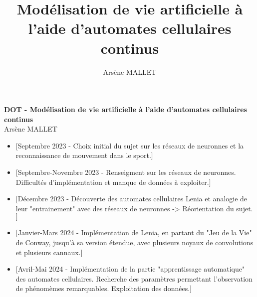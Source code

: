 \documentclass[a4paper, 11pt]{article}
\author{Arsène MALLET}
\title{Mod\'elisation de vie artificielle à l'aide d'automates cellulaires continus}
\begin{document}
    
\begin{center}
    {\textbf {\LARGE DOT - Mod\'elisation de vie artificielle à l'aide d'automates cellulaires continus}} \\
    \vspace{3mm}
    {\small Arsène MALLET}
\end{center}

\vspace{5mm}

\begin{itemize}
    \item $\bigl[$Septembre 2023 - Choix initial du sujet sur les r\'eseaux de neuronnes et la reconnaissance de mouvement dans le sport.$\bigr]$
    \item $\bigl[$Septembre-Novembre 2023 - Renseigment sur les r\'eseaux de neuronnes. Difficult\'es d'impl\'ementation et manque de donn\'ees \`a exploiter.$\bigr]$
    \item $\bigl[$D\'ecembre 2023 - D\'ecouverte des automates cellulaires Lenia et analogie de leur "entrainement" avec des r\'eseaux de neuronnes -> R\'eorientation du sujet. $\bigr]$
    \item $\bigl[$Janvier-Mars 2024 -  Impl\'ementation de Lenia, en partant du "Jeu de la Vie" de Conway, jusqu'\`a sa version \'etendue, avec plusieurs noyaux de convolutions et plusieurs cannaux.$\bigr]$
    \item $\bigl[$Avril-Mai 2024 - Impl\'ementation de la partie "apprentissage automatique" des automates cellulaires. Recherche des param\`etres permettant l'observation de ph\'enom\`emes remarquables. Exploitation des donn\'ees.$\bigr]$
\end{itemize}
\end{document}
